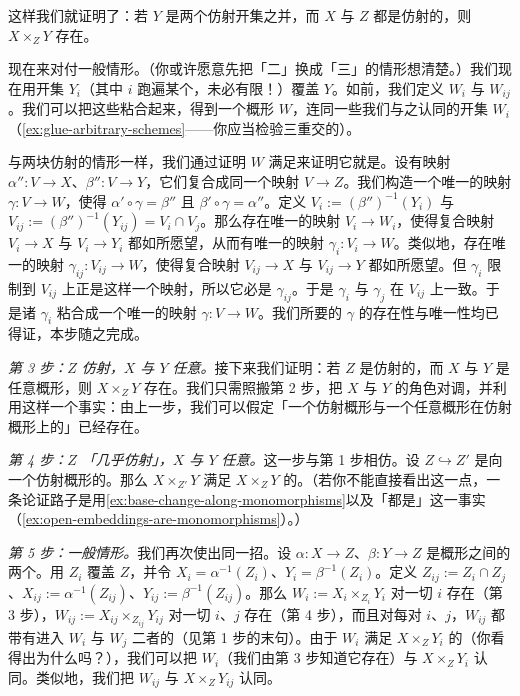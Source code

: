 这样我们就证明了：若 $Y$ 是两个仿射开集之并，而 $X$ 与 $Z$ 都是仿射的，则 $X\times_Z Y$ 存在。

现在来对付一般情形。（你或许愿意先把「二」换成「三」的情形想清楚。）我们现在用开集 $Y_i$（其中 $i$ 跑遍某个\trIndexSet，未必有限！）覆盖 $Y$。如前，我们定义 $W_i$ 与 $W_{ij}$。我们可以把这些粘合起来，得到一个概形 $W$，连同一些我们与之认同的开集 $W_i$（\cref{ex:glue-arbitrary-schemes}——你应当检验三重交的\trCocycleCondition）。

与两块仿射的情形一样，我们通过证明 $W$ 满足\trUniversalProperty{}来证明它就是\trFiberProduct。设有映射 $\alpha''\colon V\to X$、$\beta''\colon V\to Y$，它们复合成同一个映射 $V\to Z$。我们构造一个唯一的映射 $\gamma\colon V\to W$，使得 $\alpha'\circ\gamma=\beta''$ 且 $\beta'\circ\gamma=\alpha''$。定义 $V_i:=(\beta'')^{-1}(Y_i)$ 与 $V_{ij}:=(\beta'')^{-1}(Y_{ij})=V_i\cap V_j$。那么存在唯一的映射 $V_i\to W_i$，使得复合映射 $V_i\to X$ 与 $V_i\to Y_i$ 都如所愿望，从而有唯一的映射 $\gamma_i\colon V_i\to W$。类似地，存在唯一的映射 $\gamma_{ij}\colon V_{ij}\to W$，使得复合映射 $V_{ij}\to X$ 与 $V_{ij}\to Y$ 都如所愿望。但 $\gamma_i$ 限制到 $V_{ij}$ 上正是这样一个映射，所以它必是 $\gamma_{ij}$。于是 $\gamma_i$ 与 $\gamma_j$ 在 $V_{ij}$ 上一致。于是诸 $\gamma_i$ 粘合成一个唯一的映射 $\gamma\colon V\to W$。我们所要的 $\gamma$ 的存在性与唯一性均已得证，本步随之完成。

\emph{第 3 步：$Z$ 仿射，$X$ 与 $Y$ 任意。}\quad 接下来我们证明：若 $Z$ 是仿射的，而 $X$ 与 $Y$ 是任意概形，则 $X\times_Z Y$ 存在。我们只需照搬第 2 步，把 $X$ 与 $Y$ 的角色对调，并利用这样一个事实：由上一步，我们可以假定「一个仿射概形与一个任意概形在仿射概形上的\trFiberProduct」已经存在。

\emph{第 4 步：$Z$ 「几乎仿射」，$X$ 与 $Y$ 任意。}\quad 这一步与第 1 步相仿。设 $Z\hookrightarrow Z'$ 是向一个仿射概形的\trOpenEmbedding。那么 $X\times_{Z'}Y$ 满足 $X\times_Z Y$ 的\trUniversalProperty。（若你不能直接看出这一点，一条论证路子是用\cref{ex:base-change-along-monomorphisms}以及「\trOpenEmbedding{}都是\trMonomorphism」这一事实（\cref{ex:open-embeddings-are-monomorphisms}）。）

\emph{第 5 步：一般情形。}\quad 我们再次使出同一招。设 $\alpha\colon X\to Z$、$\beta\colon Y\to Z$ 是概形之间的两个\trMorphism。用\trAffine\trOpenSubscheme{} $Z_i$ 覆盖 $Z$，并令 $X_i=\alpha^{-1}(Z_i)$、$Y_i=\beta^{-1}(Z_i)$。定义 $Z_{ij}:=Z_i\cap Z_j$、$X_{ij}:=\alpha^{-1}(Z_{ij})$、$Y_{ij}:=\beta^{-1}(Z_{ij})$。那么 $W_i:=X_i\times_{Z_i}Y_i$ 对一切 $i$ 存在（第 3 步），$W_{ij}:=X_{ij}\times_{Z_{ij}}Y_{ij}$ 对一切 $i$、$j$ 存在（第 4 步），而且对每对 $i$、$j$，$W_{ij}$ 都带有进入 $W_i$ 与 $W_j$ 二者的\trCanonical\trOpenEmbedding（见第 1 步的末句）。由于 $W_i$ 满足 $X\times_Z Y_i$ 的\trUniversalProperty（你看得出为什么吗？），我们可以\trCanonically{}把 $W_i$（我们由第 3 步知道它存在）与 $X\times_Z Y_i$ 认同。类似地，我们把 $W_{ij}$ 与 $X\times_Z Y_{ij}$ 认同。

